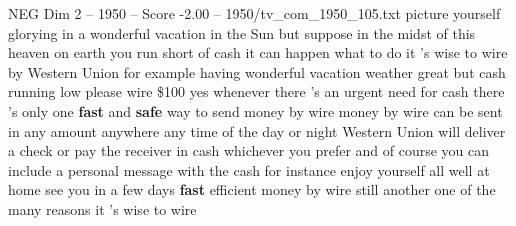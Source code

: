 \begin{textsample}{NEG Dim 2 – 1950 – Score -2.00 – 1950/tv\_com\_1950\_105.txt}  \label{ex:f2_neg_088}
picture yourself glorying in a wonderful vacation in the Sun but suppose in the midst of this heaven on earth you run short of cash it can happen what to do it 's wise to wire by Western Union for example having wonderful vacation weather great but cash running low please wire \$100 yes whenever there 's an urgent need for cash there 's only one \textbf{fast} and \textbf{safe} way to send money by wire money by wire can be sent in any amount anywhere any time of the day or night Western Union will deliver a check or pay the receiver in cash whichever you prefer and of course you can include a personal message with the cash for instance enjoy yourself all well at home see you in a few days \textbf{fast} efficient money by wire still another one of the many reasons it 's wise to wire

\end{textsample}
